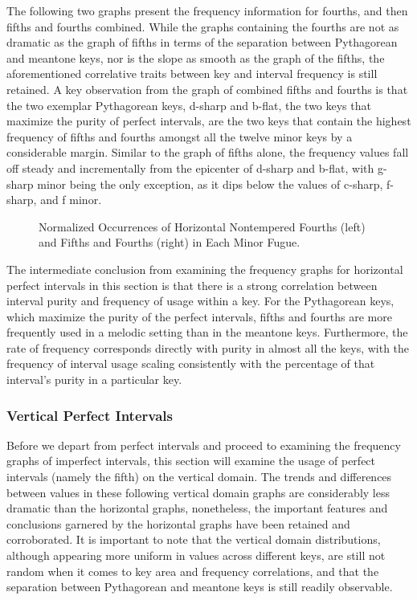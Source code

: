 The following two graphs present the frequency information for fourths,
and then fifths and fourths combined. While the graphs containing the
fourths are not as dramatic as the graph of fifths in terms of the
separation between Pythagorean and meantone keys, nor is the slope as
smooth as the graph of the fifths, the aforementioned correlative traits
between key and interval frequency is still retained. A key observation
from the graph of combined fifths and fourths is that the two exemplar
Pythagorean keys, d-sharp and b-flat, the two keys that maximize the
purity of perfect intervals, are the two keys that contain the highest
frequency of fifths and fourths amongst all the twelve minor keys by a
considerable margin. Similar to the graph of fifths alone, the frequency
values fall off steady and incrementally from the epicenter of d-sharp
and b-flat, with g-sharp minor being the only exception, as it dips
below the values of c-sharp, f-sharp, and f minor.



\begin{figure}[H]
    \begin{center}
    \caption[Normalized Occurrences of Horizontal Nontempered Fifths and Fourths in Each Minor Fugue. ]{Normalized Occurrences of Horizontal Nontempered Fourths (left) and Fifths and Fourths (right) in Each Minor Fugue.}
    \end{center}
\end{figure}
    
    The intermediate conclusion from examining the frequency graphs for
horizontal perfect intervals in this section is that there is a strong
correlation between interval purity and frequency of usage within a key.
For the Pythagorean keys, which maximize the purity of the perfect
intervals, fifths and fourths are more frequently used in a melodic
setting than in the meantone keys. Furthermore, the rate of frequency
corresponds directly with purity in almost all the keys, with the
frequency of interval usage scaling consistently with the percentage of
that interval's purity in a particular key.

    \subsubsection{Vertical Perfect
Intervals}\label{vertical-perfect-intervals}

Before we depart from perfect intervals and proceed to examining the
frequency graphs of imperfect intervals, this section will examine the
usage of perfect intervals (namely the fifth) on the vertical domain.
The trends and differences between values in these following vertical
domain graphs are considerably less dramatic than the horizontal graphs,
nonetheless, the important features and conclusions garnered by the
horizontal graphs have been retained and corroborated. It is important
to note that the vertical domain distributions, although appearing more
uniform in values across different keys, are still not random when it
comes to key area and frequency correlations, and that the separation
between Pythagorean and meantone keys is still readily observable.

